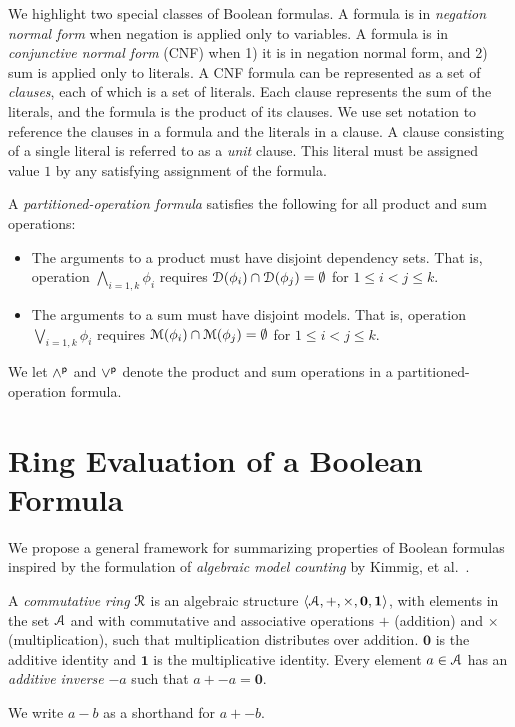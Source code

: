 \documentclass[letterpaper,USenglish,cleveref, autoref, thm-restate]{lipics-v2021}
\newcommand{\pand}{\mathbin{\land^{\sf p}}}
\newcommand{\por}{\mathbin{\lor^{\sf p}}}
\newcommand{\dependencyset}{{\cal D}}
\newcommand{\ring}{{\cal R}}
\newcommand{\dset}{{\cal A}}
\newcommand{\radd}{+}
\newcommand{\rmul}{\times}
\newcommand{\addident}{\textbf{0}}
\newcommand{\mulident}{\textbf{1}}
\newcommand{\modelset}{{\cal M}}
\begin{document}
  We highlight two special classes of Boolean formulas.  A formula is
  in {\em negation normal form} when negation is applied only to variables.  A
  formula is in {\em conjunctive normal form} (CNF) when 1) it is in
  negation normal form, and 2) sum is applied only to literals.  A CNF
  formula can be represented as a set of {\em clauses}, each of which is a
  set of literals.  Each clause represents the sum of the
  literals, and the formula is the product of its clauses.  We use
  set notation to reference the clauses in a formula and the
  literals in a clause.  A clause consisting of a single literal is referred to as a {\em unit} clause.
This literal must be assigned value $1$ by any satisfying assignment of the formula.

  A {\em partitioned-operation formula}
 satisfies the following for all product and sum operations:
      \begin{itemize}
      \item The arguments to a product must have disjoint dependency sets.  That is, operation
        $\bigwedge_{i=1,k} \phi_i$ requires $\dependencyset(\phi_i) \cap \dependencyset(\phi_j) = \emptyset$ for $1 \leq i < j \leq k$.
      \item The arguments to a sum must have disjoint models.  That is, operation
        $\bigvee_{i=1,k} \phi_i$ requires $\modelset(\phi_i) \cap \modelset(\phi_j) = \emptyset$ for $1 \leq i < j \leq k$.
      \end{itemize}
     We let $\pand$ and $\por$ denote the product and sum operations in a partitioned-operation formula.

  \section{Ring Evaluation of a Boolean Formula}

We propose a general framework for summarizing properties of Boolean
formulas inspired by the formulation of {\em algebraic model counting}
by Kimmig, et al.~\cite{kimmig:jal:2017}.

\begin{definition}
  A {\em commutative ring} $\ring$ is an algebraic structure
  $\langle \dset, \radd, \rmul, \addident, \mulident \rangle$,
  with elements in the set $\dset$ and with commutative and
  associative operations $\radd$ (addition) and $\rmul$ (multiplication),
  such that multiplication distributes
  over addition.  $\addident$ is the additive identity and $\mulident$ is
  the multiplicative identity.  Every element $a \in \dset$ has an
  {\em additive inverse} $-a$ such that $a + -a = \addident$.
\label{def:ring}
\end{definition}
We write $a - b$ as a shorthand for $a + -b$.
\end{document}
